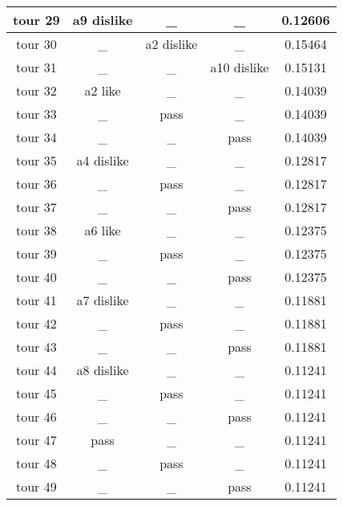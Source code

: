 \documentclass{article}
\begin{document}
\begin{tabular}{|c|c|c|c|c|}
\hline
tour 29 & a9 dislike & \_ & \_ & 0.12606 \\
\hline
tour 30 & \_ & a2 dislike & \_ & 0.15464 \\
\hline
tour 31 & \_ & \_ & a10 dislike & 0.15131 \\
\hline
tour 32 & a2 like & \_ & \_ & 0.14039 \\
\hline
tour 33 & \_ & pass & \_ & 0.14039 \\
\hline
tour 34 & \_ & \_ & pass & 0.14039 \\
\hline
tour 35 & a4 dislike & \_ & \_ & 0.12817 \\
\hline
tour 36 & \_ & pass & \_ & 0.12817 \\
\hline
tour 37 & \_ & \_ & pass & 0.12817 \\
\hline
tour 38 & a6 like & \_ & \_ & 0.12375 \\
\hline
tour 39 & \_ & pass & \_ & 0.12375 \\
\hline
tour 40 & \_ & \_ & pass & 0.12375 \\
\hline
tour 41 & a7 dislike & \_ & \_ & 0.11881 \\
\hline
tour 42 & \_ & pass & \_ & 0.11881 \\
\hline
tour 43 & \_ & \_ & pass & 0.11881 \\
\hline
tour 44 & a8 dislike & \_ & \_ & 0.11241 \\
\hline
tour 45 & \_ & pass & \_ & 0.11241 \\
\hline
tour 46 & \_ & \_ & pass & 0.11241 \\
\hline
tour 47 & pass & \_ & \_ & 0.11241 \\
\hline
tour 48 & \_ & pass & \_ & 0.11241 \\
\hline
tour 49 & \_ & \_ & pass & 0.11241 \\
\hline
\end{tabular}
\end{document}

